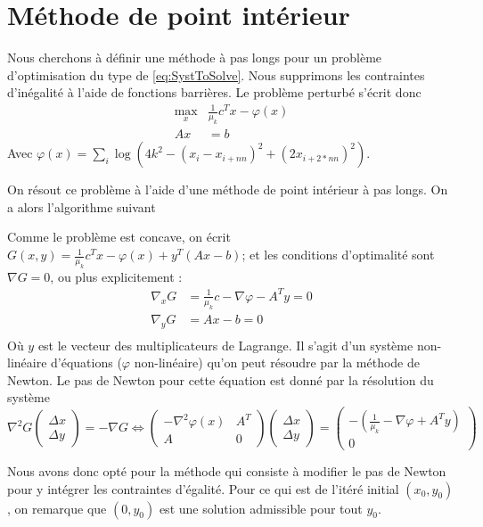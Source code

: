 \section{Méthode de point intérieur}

Nous cherchons à définir une méthode à pas longs pour un problème d'optimisation du type de \eqref{eq:SystToSolve}. Nous supprimons les contraintes d'inégalité à l'aide de fonctions barrières. Le problème perturbé s'écrit donc
\begin{align*}
\max_{x}  & \frac{1}{\mu_k}c^Tx - \varphi(x) \\
Ax & =  b
\end{align*}
Avec $\varphi(x) = \sum_{i} \log(4k^2 - (x_i-x_{i+nn})^2+(2x_{i+2*nn})^2)$.

On résout ce problème à l'aide d'une méthode de point intérieur à pas longs.
On a alors l'algorithme suivant
\begin{algorithm}[!h]

\end{algorithm}


Comme le problème est concave, on écrit $G(x,y) = \frac{1}{\mu_k}c^Tx -\varphi(x) +y^T(Ax-b)$; et les conditions d'optimalité sont $\nabla G=0 $, ou plus explicitement :
\begin{align*}
\nabla_{x}G & =  \frac{1}{\mu_k}c -\nabla \varphi -A^Ty = 0 \\
\nabla_{y}G & =  Ax-b= 0 \\
\end{align*}
Où $y$ est le vecteur des multiplicateurs de Lagrange. Il s'agit d'un système non-linéaire d'équations ($\varphi$ non-linéaire) qu'on peut résoudre par la méthode de Newton. 
Le pas de Newton pour cette équation est donné par la résolution du système 
\begin{equation}
\nabla^2G  \begin{pmatrix}
\Delta x \\ \Delta y
\end{pmatrix}
= 
-\nabla G
\Longleftrightarrow
\begin{pmatrix}
-\nabla^2 \varphi(x) & A^T \\
A & 0
\end{pmatrix} \begin{pmatrix}
\Delta x \\ \Delta y
\end{pmatrix} = \begin{pmatrix}
-(\frac{1}{\mu_k}-\nabla \varphi + A^Ty)\\
0
\end{pmatrix}
\end{equation}

Nous avons donc opté pour la méthode qui consiste à modifier le pas de Newton pour y intégrer les contraintes d'égalité.
Pour ce qui est de l'itéré initial $(x_0,y_0)$, on remarque que $(0,y_0)$ est une solution admissible pour tout $y_0$.